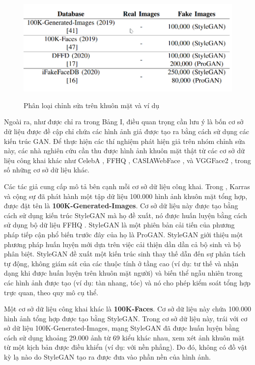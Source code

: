 \documentclass{article}
\begin{document}
\begin{figure}[h!]
\caption{Phân loại chỉnh sửa trên khuôn mặt và ví dụ}
\includegraphics[width=\columnwidth]{table-1-database}
\label{table-1-database}
\end{figure}

Ngoài ra, như được chỉ ra trong Bảng I, điều quan trọng cần lưu ý là bốn cơ sở dữ liệu được đề cập chỉ chứa các hình ảnh giả được tạo ra bằng cách sử dụng các kiến trúc GAN. Để thực hiện các thí nghiệm phát hiện giả trên nhóm chỉnh sửa này, các nhà nghiên cứu cần thu được hình ảnh khuôn mặt thật từ các cơ sở dữ liệu công khai khác như CelebA , FFHQ , CASIAWebFace , và VGGFace2 , trong số những cơ sở dữ liệu khác.

Các tác giả cung cấp mô tả bên cạnh mỗi cơ sở dữ liệu công khai. Trong , Karras và cộng sự đã phát hành một tập dữ liệu 100.000 hình ảnh khuôn mặt tổng hợp, được đặt tên là \textbf{100K-Generated-Images}. Cơ sở dữ liệu này được tạo bằng cách sử dụng kiến trúc StyleGAN mà họ đề xuất, nó được huấn luyện bằng cách sử dụng bộ dữ liệu FFHQ . StyleGAN là một phiên bản cải tiến của phương pháp tiếp cận phổ biến trước đây của họ là ProGAN. StyleGAN giới thiệu một phương pháp huấn luyện mới dựa trên việc cải thiện dần dần cả bộ sinh và bộ phân biệt. StyleGAN đề xuất một kiến trúc sinh thay thế dẫn đến sự phân tách tự động, không giám sát của các thuộc tính ở tầng cao (ví dụ: tư thế và nhận dạng khi được huấn luyện trên khuôn mặt người) và biến thể ngẫu nhiên trong các hình ảnh được tạo (ví dụ: tàn nhang, tóc) và nó cho phép kiểm soát tổng hợp trực quan, theo quy mô cụ thể.

Một cơ sở dữ liệu công khai khác là \textbf{100K-Faces}. Cơ sở dữ liệu này chứa 100.000 hình ảnh tổng hợp được tạo bằng StyleGAN. Trong cơ sở dữ liệu này, trái với cơ sở dữ liệu 100K-Generated-Images, mạng StyleGAN đã được huấn luyện bằng cách sử dụng khoảng 29.000 ảnh từ 69 kiểu khác nhau, xem xét ảnh khuôn mặt từ một kịch bản được điều khiển (ví dụ: với nền phẳng). Do đó, không có đồ vật kỳ lạ nào do StyleGAN tạo ra được đưa vào phần nền của hình ảnh.
\end{document}
